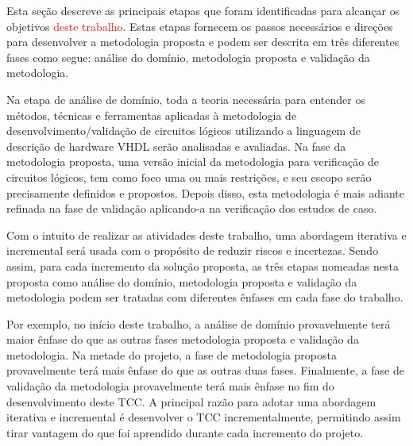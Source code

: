 Esta seção descreve as principais etapas que foram identificadas para alcançar os objetivos \textcolor{red}{deste trabalho}. Estas etapas fornecem os passos necessários e direções para desenvolver a metodologia proposta e podem ser descrita em três diferentes fases como segue: análise do domínio, metodologia proposta e validação da metodologia.

Na etapa de análise de domínio, toda a teoria necessária para entender os métodos, técnicas e ferramentas aplicadas à metodologia de desenvolvimento/validação de circuitos lógicos utilizando a linguagem de descrição de hardware VHDL serão analisadas e avaliadas. Na fase da metodologia proposta, uma versão inicial da metodologia para verificação de circuitos lógicos, tem como foco uma ou mais restrições, e seu escopo serão precisamente definidos e propostos. Depois disso, esta metodologia é mais adiante refinada na fase de validação aplicando-a na verificação dos estudos de caso.

Com o intuito de realizar as atividades deste trabalho, uma abordagem iterativa e incremental será usada com o propósito de reduzir riscos e incertezas. Sendo assim, para cada incremento da solução proposta, as três etapas nomeadas nesta proposta como análise do domínio, metodologia proposta e validação da metodologia podem ser tratadas com diferentes ênfases em cada fase do trabalho.

Por exemplo, no início deste trabalho, a análise de domínio provavelmente terá maior ênfase do que as outras fases metodologia proposta e validação da metodologia. Na metade do projeto, a fase de metodologia proposta provavelmente terá mais ênfase do que as outras duas fases. Finalmente, a fase de validação da metodologia provavelmente terá mais ênfase no fim do desenvolvimento deste TCC. A principal razão para adotar uma abordagem iterativa e incremental é desenvolver o TCC incrementalmente, permitindo assim tirar vantagem do que foi aprendido durante cada incremento do projeto.


